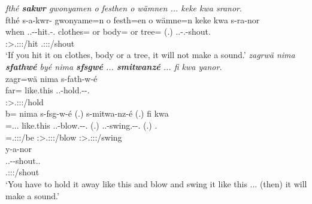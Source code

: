 \begin{exe}
\ex
\label{ex373}
\begin{xlist}
	\ex
	\emph{fthé \textbf{sakwr} gwonyamen o festhen o wämnen ... keke kwa sranor}.\\
	\glll fthé s-a-kwr-\Zero{} gwonyame=n o festh=en o wämne=n keke kwa s-ra-nor\\
	when \Tsg.\Masc.\Alph-\Ndu-hit.\Rs-\Ssg.\Imp{} clothes=\Loc{} or body=\Loc{} or tree=\Loc{} (.) \Neg{} \Fut{} \Tsg.\Masc.\Bet-\Irr.\Vc-shout.\Ext\\
	{} \footnotesize{\Fsg:\Sbj>\Tsg.\Masc:\Obj:\Imp:\Pfv/hit} {} {} {} {} {} {} {} {} \footnotesize{\Tsg.\Masc:\Sbj:\Irr:\Ipfv/shout}\\
	\trans `If you hit it on clothes, body or a tree, it will not make a sound.'
	\label{ex372}
	\ex
	\emph{zagrwä nima \textbf{sfathwé} byé nima \textbf{sfsgwé} ... \textbf{smitwanzé} ... fi kwa yanor.}\\
	\glll zagr=wä nima s-fath-w-é\\
	far=\Emph{} like.this \Tsg.\Masc.\Bet-hold.\Ext-\Ndu-\Ssg.\Imp{}\\
	{} {} \footnotesize{\Ssg:\Sbj>\Tsg.\Masc:\Obj:\Imp:\Ipfv/hold}\\
	\sn
	\glll b= nima s-fsg-w-é (.)\hspace*{2cm} s-mitwa-nz-é (.) fi kwa\\
	\Med=\Tsg.\Masc.\Cop.\Ndu{} like.this \Tsg.\Masc.\Bet-blow.\Ext-\Ndu-\Ssg.\Imp{} (.) \Tsg.\Masc.\Bet-swing.\Ext-\Ndu-\Ssg.\Imp{} (.) \Third.\Abs{} \Fut{}\\
	\footnotesize{\Med=\Tsg.\Masc:\Sbj:\Nonpast:\Ipfv/be} {} \footnotesize{\Ssg:\Sbj>\Tsg.\Masc:\Obj:\Imp:\Ipfv/blow} {} \footnotesize{\Ssg:\Sbj>\Tsg.\Masc:\Obj:\Imp:\Ipfv/swing} {} {} {}\\
	\sn
	\glll y-a-nor\\
	\Tsg.\Masc.\Alph-\Vc-shout.\Ext.\Ndu\\
	\footnotesize{\Tsg.\Masc:\Sbj:\Nonpast:\Ipfv/shout}\\
	\trans `You have to hold it away like this and blow and swing it like this ... (then) it will make a sound.' 
	\label{ex371}
\end{xlist}
\end{exe}

